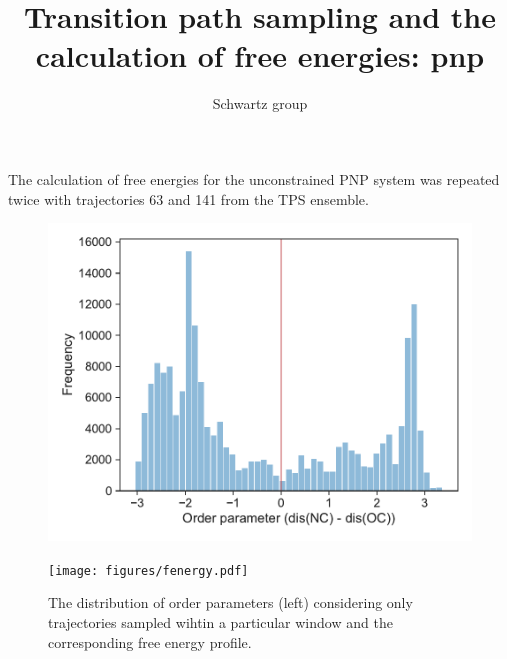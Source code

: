 \documentclass{report}
\title{Transition path sampling and the calculation of free energies: pnp}
\author{Schwartz group}
\begin{document}
\maketitle
The calculation of free energies for the unconstrained PNP system was repeated twice with
trajectories 63 and 141 from the TPS ensemble. 

\begin{figure}[ht]
  \centering
  \begin{minipage}[b]{0.45\linewidth}
    \includegraphics[scale=0.53]{figures/dist.pdf}
    \label{fig:dist}
  \end{minipage}
  \quad
  \begin{minipage}[b]{0.45\linewidth}
    \texttt{[image: figures/fenergy.pdf]}
    \label{fig:fenergy}
  \end{minipage}
  \caption{The distribution of order parameters (left) considering only trajectories sampled wihtin a particular window and the corresponding free energy profile.}
\end{figure}
\end{document}
